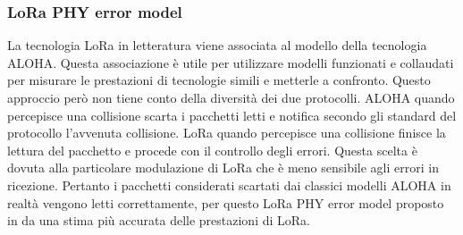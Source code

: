 \documentclass[a4paper]{report} %
\begin{document}
\subsubsection{LoRa PHY error model}
La tecnologia LoRa in letteratura viene associata al modello della tecnologia ALOHA. Questa associazione è utile per utilizzare modelli funzionati e collaudati per misurare le prestazioni di tecnologie simili e metterle a confronto. Questo approccio però non tiene conto della diversità dei due protocolli. ALOHA quando percepisce una collisione scarta i pacchetti letti e notifica secondo gli standard del protocollo l'avvenuta collisione. LoRa quando percepisce una collisione finisce la lettura del pacchetto e procede con il controllo degli errori. Questa scelta è dovuta alla particolare modulazione di LoRa che è meno sensibile agli errori in ricezione. Pertanto i pacchetti considerati scartati dai classici modelli ALOHA in realtà vengono letti correttamente, per questo LoRa PHY error model proposto in \cite{art:rif.49} da una stima più accurata delle prestazioni di LoRa.
\end{document}
